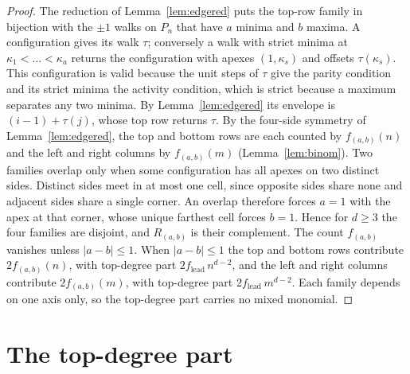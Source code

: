 \documentclass[11pt]{article}
\theoremstyle{definition}
\theoremstyle{remark}
\begin{document}
\begin{proof}
The reduction of Lemma~\ref{lem:edgered} puts the top-row family in bijection with
the $\pm1$ walks on $P_n$ that have $a$ minima and $b$ maxima. A configuration
gives its walk $\tau$; conversely a walk with strict minima at
$\kappa_1<\dots<\kappa_a$ returns the configuration with apexes $(1,\kappa_s)$ and
offsets $\tau(\kappa_s)$. This configuration is valid because the unit steps of
$\tau$ give the parity condition and its strict minima the activity condition, which
is strict because a maximum separates any two minima. By Lemma~\ref{lem:edgered}
its envelope is $(i-1)+\tau(j)$, whose top row returns $\tau$. By the four-side
symmetry of Lemma~\ref{lem:edgered}, the top and bottom rows are each counted by
$f_{(a,b)}(n)$ and the left and right columns by $f_{(a,b)}(m)$
(Lemma~\ref{lem:binom}). Two families overlap only when some configuration has all
apexes on two distinct sides. Distinct sides meet in at most one cell, since opposite
sides share none and adjacent sides share a single corner. An overlap therefore forces
$a=1$ with the apex at that corner, whose unique farthest cell forces $b=1$. Hence
for $d\ge3$ the four families are disjoint, and $R_{(a,b)}$ is their complement. The count
$f_{(a,b)}$ vanishes unless $|a-b|\le1$. When $|a-b|\le1$ the top and
bottom rows contribute $2f_{(a,b)}(n)$, with top-degree part
$2f_{\mathrm{lead}}\,n^{d-2}$, and the left and right columns contribute $2f_{(a,b)}(m)$,
with top-degree part $2f_{\mathrm{lead}}\,m^{d-2}$. Each family depends on one axis only, so the top-degree part
carries no mixed monomial.
\end{proof}

\section{The top-degree part}\label{sec:leading}
\end{document}
